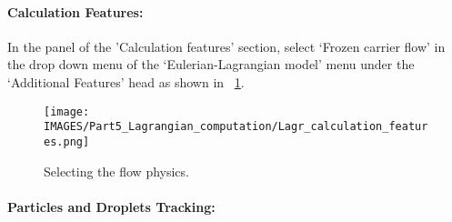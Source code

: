 \paragraph{Calculation Features:}

In the panel of the 'Calculation features' section, select ‘Frozen carrier flow’ in the drop down menu of the ‘Eulerian-Lagrangian model’ menu under the ‘Additional Features’ head as shown in \figurename~\ref{lag:flow_physics}.
%
\begin{figure}[H]
\centering
\texttt{[image: \\IMAGES/Part5\_Lagrangian\_computation/Lagr\_calculation\_features.png]}
\caption{Selecting the flow physics.}\label{lag:flow_physics}
\end{figure}
%
\paragraph{Particles and Droplets Tracking:}

